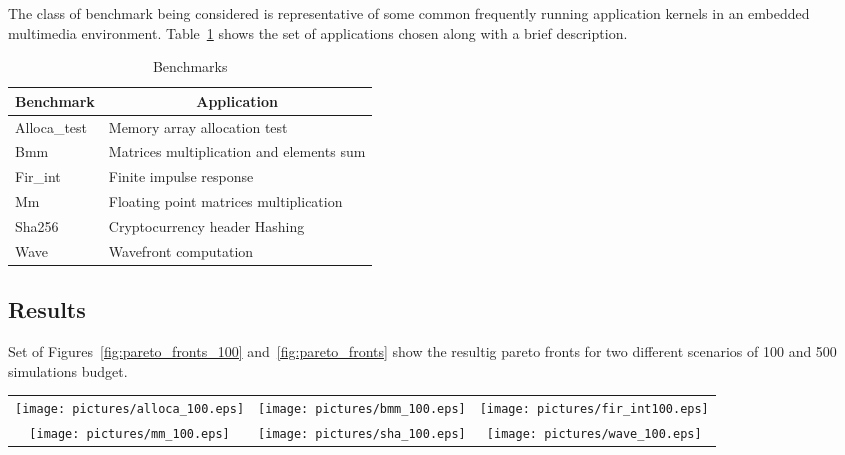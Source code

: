 \begin{itemize}
The class of benchmark being considered is representative of some common
frequently running application kernels in an embedded multimedia
environment. Table~\ref{tab:bench} shows the set of applications
chosen along with a brief description.
\begin{table}
	\centering
	\caption{Benchmarks}
	\label{tab:bench}
	\begin{tabular}{ll}
	\hline
	\multicolumn{1}{c}{Benchmark} & \multicolumn{1}{c}{Application} \\
	\hline
	Alloca\_test & Memory array allocation test \\
	Bmm & Matrices multiplication and elements sum \\
	Fir\_int & Finite impulse response \\
	Mm & Floating point matrices multiplication \\
	Sha256 & Cryptocurrency header Hashing \\
	Wave & Wavefront computation \\
	\hline
	\end{tabular}
\end{table}

\subsection{Results}

Set of Figures~\ref{fig:pareto_fronts_100}
and~\ref{fig:pareto_fronts} show the resultig pareto fronts for two
different scenarios of 100 and 500 simulations budget.

\begin{table*}
  \centering
  \begin{tabular}{ccc}
    \texttt{[image: pictures/alloca\_100.eps]} &
    \texttt{[image: pictures/bmm\_100.eps]} & 
    \texttt{[image: pictures/fir\_int100.eps]} \\
    \texttt{[image: pictures/mm\_100.eps]} &
    \texttt{[image: pictures/sha\_100.eps]} &
    \texttt{[image: pictures/wave\_100.eps]} 
  \end{tabular}
  \caption{Pareto fronts found by PS and GA for a fixed budget of 100 configurations.}
  \label{fig:pareto_fronts_100}
\end{table*}


\end{itemize}
